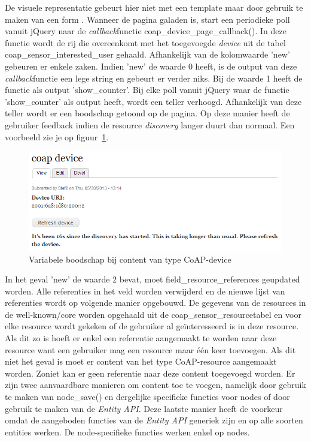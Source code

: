 De visuele representatie gebeurt hier niet met een template maar door gebruik te maken van een form \cite{formAPI}. Wanneer de pagina galaden is, start een periodieke poll vanuit jQuery naar de \textit{callback}functie coap\_device\_page\_callback(). In deze functie wordt de rij die overeenkomt met het toegevoegde \textit{device} uit de tabel coap\_sensor\_interested\_user gehaald. Afhankelijk van de kolomwaarde 'new' gebeuren er enkele zaken. Indien 'new' de waarde 0 heeft, is de output van deze \textit{callback}functie een lege string en gebeurt er verder niks. Bij de waarde 1 heeft de functie als output 'show\_counter'. Bij elke poll vanuit jQuery waar de functie 'show\_counter' als output heeft, wordt een teller verhoogd. Afhankelijk van deze teller wordt er een boodschap getoond op de pagina. Op deze manier heeft de gebruiker feedback indien de resource \textit{discovery} langer duurt dan normaal. Een voorbeeld zie je op figuur~\ref{fig:coapDeviceMessage}.
\begin{figure}[h!]
\centering
\includegraphics[width=1\textwidth]{fig/CoAPDeviceMessage}
\caption{Variabele boodschap bij content van type CoAP-device}
\label{fig:coapDeviceMessage}
\end{figure}

\noindent
In het geval 'new' de waarde 2 bevat, moet field\_resource\_references geupdated worden. Alle referenties in het veld worden verwijderd en de nieuwe lijst van referenties wordt op volgende manier opgebouwd. De gegevens van de resources in de well-known/core worden opgehaald uit de coap\_sensor\_resourcetabel en voor elke resource wordt gekeken of de gebruiker al ge\"{i}nteresseerd is in deze resource. Als dit zo is hoeft er enkel een referentie aangemaakt te worden naar deze resource want een gebruiker mag een resource maar \'{e}\'{e}n keer toevoegen. Als dit niet het geval is moet er content van het type CoAP-resource aangemaakt worden. Zoniet kan er geen referentie naar deze content toegevoegd worden. Er zijn twee aanvaardbare manieren om content toe te voegen, namelijk door gebruik te maken van node\_save() en dergelijke specifieke functies voor nodes of door gebruik te maken van de \textit{Entity API}. Deze laatste manier heeft de voorkeur omdat de aangeboden functies van de \textit{Entity API} generiek zijn en op alle soorten entities werken. De node-specifieke functies werken enkel op nodes.\\

